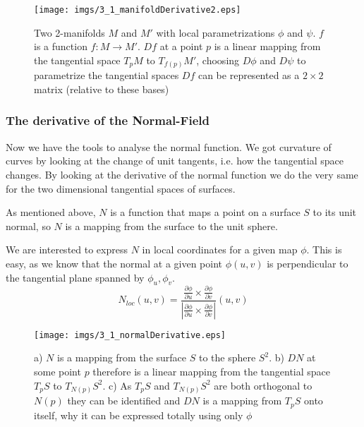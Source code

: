 \begin{figure}
\begin{center}
\texttt{[image: imgs/3\_1\_manifoldDerivative2.eps]}
\end{center}
\caption{Two 2-manifolds $M$ and $M'$ with local parametrizations $\phi$ and $\psi$. $f$ is a function $f: M \rightarrow M'$. $Df$ at a point $p$ is a linear mapping from the tangential space $T_p M$ to $T_{f(p)} M'$, choosing $D\phi$ and $D \psi$ to parametrize the tangential spaces $Df$ can be represented as a $2\times 2$ matrix (relative to these bases)}
\label{fig::3_1_manifoldDerivative2}
\end{figure}


\subsubsection{The derivative of the Normal-Field}
Now we have the tools to analyse the normal function. We got curvature of curves by looking at the change of unit tangents, i.e. how the tangential space changes. By looking at the derivative of the normal function we do the very same for the two dimensional tangential spaces of surfaces.


As mentioned above, $N$ is a function that maps a point on a surface $S$ to its unit normal, so $N$ is a mapping from the surface to the unit sphere.

We are interested to express $N$ in local coordinates for a given map $\phi$. This is easy, as we know that the normal at a given point $\phi(u,v)$ is perpendicular to the tangential plane spanned by $\phi_u, \phi_v$.
\[N_{loc}(u,v) = \frac{\frac{\partial \phi}{\partial u} \times \frac{\partial \phi}{\partial v}}{|\frac{\partial \phi}{\partial u} \times \frac{\partial \phi}{\partial v}|} (u,v) \]

\begin{figure}[ht]
\begin{center}
\texttt{[image: imgs/3\_1\_normalDerivative.eps]}
\end{center}
\caption{a) $N$ is a mapping from the surface $S$ to the sphere $S^2$. b) $DN$ at some point $p$ therefore is a linear mapping from the tangential space $T_pS$ to $T_{N(p)}S^2$. c) As $T_pS$ and $T_{N(p)}S^2$ are both orthogonal to $N(p)$ they can be identified and $DN$ is a mapping from $T_p S$ onto itself, why it can be expressed totally using only $\phi$}
\label{fig::3_1_normalDerivative}
\end{figure}

